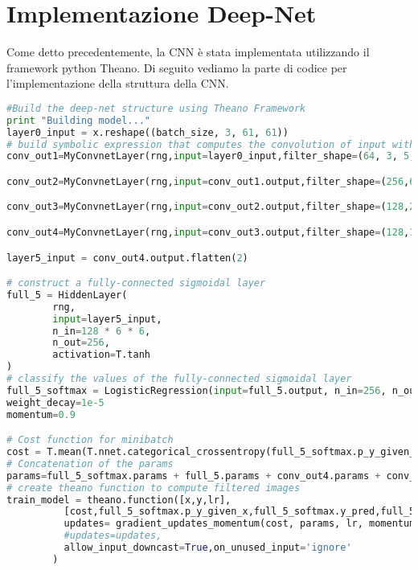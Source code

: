 \section{Implementazione Deep-Net}
Come detto precedentemente, la CNN è stata implementata utilizzando il framework python Theano. Di seguito vediamo la parte di codice per l'implementazione della struttura della CNN. 

\begin{lstlisting}[language=Python]
#Build the deep-net structure using Theano Framework
print "Building model..."
layer0_input = x.reshape((batch_size, 3, 61, 61))
# build symbolic expression that computes the convolution of input with filters in w
conv_out1=MyConvnetLayer(rng,input=layer0_input,filter_shape=(64, 3, 5, 5),image_shape=(batch_size, 3, 61, 61),conv_stride=(2,2),pool_stride=(2,2),poolsize=(3,3))

conv_out2=MyConvnetLayer(rng,input=conv_out1.output,filter_shape=(256,64,5,5),image_shape=(batch_size,64, 14, 14),conv_stride=(1,1))

conv_out3=MyConvnetLayer(rng,input=conv_out2.output,filter_shape=(128,256,3,3),image_shape=(batch_size, 256, 10, 10),conv_stride=(1,1))

conv_out4=MyConvnetLayer(rng,input=conv_out3.output,filter_shape=(128,128,3,3),image_shape=(batch_size, 128, 8, 8),conv_stride=(1,1))

layer5_input = conv_out4.output.flatten(2)

# construct a fully-connected sigmoidal layer
full_5 = HiddenLayer(
        rng,
        input=layer5_input,
        n_in=128 * 6 * 6,
        n_out=256,
        activation=T.tanh
)
# classify the values of the fully-connected sigmoidal layer
full_5_softmax = LogisticRegression(input=full_5.output, n_in=256, n_out=5)
weight_decay=1e-5
momentum=0.9

# Cost function for minibatch
cost = T.mean(T.nnet.categorical_crossentropy(full_5_softmax.p_y_given_x,y))
# Concatenation of the params
params=full_5_softmax.params + full_5.params + conv_out4.params + conv_out3.params + conv_out2.params + conv_out1.params
# create theano function to compute filtered images
train_model = theano.function([x,y,lr],
          [cost,full_5_softmax.p_y_given_x,full_5_softmax.y_pred,full_5_softmax.errors(y)],
          updates= gradient_updates_momentum(cost, params, lr, momentum,weight_decay),
          #updates=updates,
          allow_input_downcast=True,on_unused_input='ignore'
        )
\end{lstlisting} 

